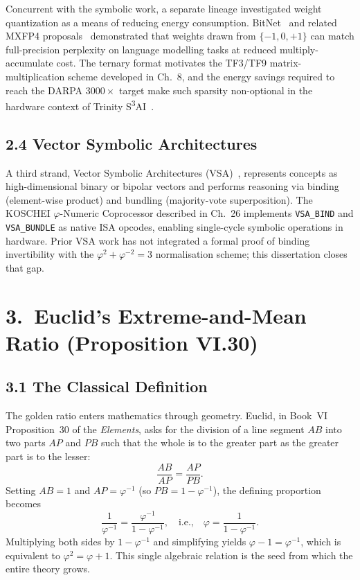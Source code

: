 Concurrent with the symbolic work, a separate lineage
investigated weight quantization as a means of
reducing energy consumption.
BitNet~\cite{ma2024bitnet} and related MXFP4
proposals~\cite{ieee2023mxfp4} demonstrated that
weights drawn from $\{-1,0,+1\}$ can match
full-precision perplexity on language modelling tasks
at reduced multiply-accumulate cost.
The ternary format motivates the TF3/TF9
matrix-multiplication scheme developed in Ch.~8,
and the energy savings required to reach the
DARPA $3000\times$ target make such sparsity
non-optional in the hardware context of Trinity
S\textsuperscript{3}AI~\cite{darpa2023mto}.

\subsection{2.4 Vector Symbolic Architectures}
\label{subsec:gc-vsa}

A third strand, Vector Symbolic Architectures
(VSA)~\cite{kanerva2009hyperdimensional},
represents concepts as high-dimensional binary or
bipolar vectors and performs reasoning via binding
(element-wise product) and bundling (majority-vote
superposition).
The KOSCHEI $\varphi$-Numeric Coprocessor described
in Ch.~26 implements \texttt{VSA\_BIND} and
\texttt{VSA\_BUNDLE} as native ISA opcodes, enabling
single-cycle symbolic operations in hardware.
Prior VSA work has not integrated a formal proof of
binding invertibility with the $\varphi^2+\varphi^{-2}=3$
normalisation scheme; this dissertation closes that
gap.

\section{3.\ Euclid's Extreme-and-Mean Ratio
         (Proposition VI.30)}
\label{sec:gc-euclid}

\subsection{3.1 The Classical Definition}
\label{subsec:gc-euclid-def}

The golden ratio enters mathematics through geometry.
Euclid, in Book~VI Proposition~30 of the
\emph{Elements}, asks for the division of a line segment
$AB$ into two parts $AP$ and $PB$ such that the
whole is to the greater part as the greater part is
to the lesser:
\[
  \frac{AB}{AP} = \frac{AP}{PB}.
\]
Setting $AB = 1$ and $AP = \varphi^{-1}$ (so
$PB = 1 - \varphi^{-1}$), the defining proportion
becomes
\[
  \frac{1}{\varphi^{-1}} = \frac{\varphi^{-1}}{1 - \varphi^{-1}},
  \quad\text{i.e.,}\quad
  \varphi = \frac{1}{1 - \varphi^{-1}}.
\]
Multiplying both sides by $1-\varphi^{-1}$ and
simplifying yields $\varphi - 1 = \varphi^{-1}$,
which is equivalent to $\varphi^2 = \varphi + 1$.
This single algebraic relation is the seed from which
the entire theory grows.

